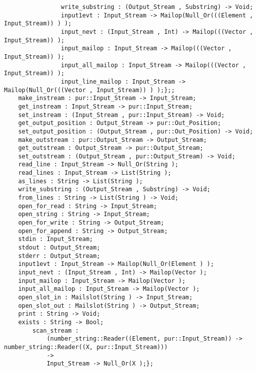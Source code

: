 \begin{verbatim}
                write_substring : (Output_Stream , Substring) -> Void;
                input1evt : Input_Stream -> Mailop(Null_Or(((Element , Input_Stream)) ) );
                input_nevt : (Input_Stream , Int) -> Mailop(((Vector , Input_Stream)) );
                input_mailop : Input_Stream -> Mailop(((Vector , Input_Stream)) );
                input_all_mailop : Input_Stream -> Mailop(((Vector , Input_Stream)) );
                input_line_mailop : Input_Stream -> Mailop(Null_Or(((Vector , Input_Stream)) ) );};;
    make_instream : pur::Input_Stream -> Input_Stream;
    get_instream : Input_Stream -> pur::Input_Stream;
    set_instream : (Input_Stream , pur::Input_Stream) -> Void;
    get_output_position : Output_Stream -> pur::Out_Position;
    set_output_position : (Output_Stream , pur::Out_Position) -> Void;
    make_outstream : pur::Output_Stream -> Output_Stream;
    get_outstream : Output_Stream -> pur::Output_Stream;
    set_outstream : (Output_Stream , pur::Output_Stream) -> Void;
    read_line : Input_Stream -> Null_Or(String );
    read_lines : Input_Stream -> List(String );
    as_lines : String -> List(String );
    write_substring : (Output_Stream , Substring) -> Void;
    from_lines : String -> List(String ) -> Void;
    open_for_read : String -> Input_Stream;
    open_string : String -> Input_Stream;
    open_for_write : String -> Output_Stream;
    open_for_append : String -> Output_Stream;
    stdin : Input_Stream;
    stdout : Output_Stream;
    stderr : Output_Stream;
    input1evt : Input_Stream -> Mailop(Null_Or(Element ) );
    input_nevt : (Input_Stream , Int) -> Mailop(Vector );
    input_mailop : Input_Stream -> Mailop(Vector );
    input_all_mailop : Input_Stream -> Mailop(Vector );
    open_slot_in : Mailslot(String ) -> Input_Stream;
    open_slot_out : Mailslot(String ) -> Output_Stream;
    print : String -> Void;
    exists : String -> Bool;
        scan_stream :
            (number_string::Reader((Element, pur::Input_Stream)) -> number_string::Reader((X, pur::Input_Stream)))
            ->
            Input_Stream -> Null_Or(X );};
\end{verbatim}
